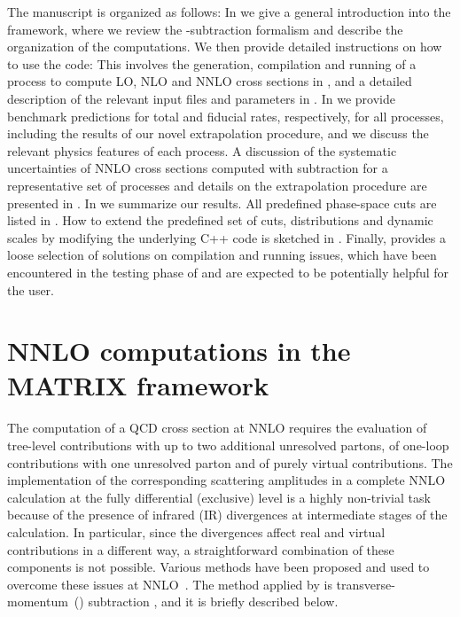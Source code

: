 \documentclass[english,11pt]{article}
\begin{document}
The manuscript is organized as follows: In  we give a general introduction into the \Matrix{} framework, 
where we review the \qt{}-subtraction formalism 
and describe the organization of the computations.  
We then provide detailed instructions on how to use the code:
This involves the generation, compilation and running of a process to compute LO, NLO and NNLO 
cross sections in , and a detailed description of the relevant input files and parameters 
in .
In  we provide benchmark predictions for total and fiducial rates, respectively, for all processes, including the results of our novel 
extrapolation procedure, and 
we discuss the relevant physics features of each process. 
A discussion of the systematic uncertainties of NNLO cross sections
computed with \qt{} subtraction for a representative set of processes
and details on the extrapolation procedure 
are presented in .
In  we summarize our results. 
All predefined phase-space cuts are listed in .
How to extend the predefined set of cuts, distributions and dynamic scales by modifying the underlying \textsc{C++} code is sketched in .
Finally,  provides a loose selection of solutions on compilation and running issues, 
which have been encountered in the testing phase of \Matrix{} and are expected to be potentially helpful for the user.

\section[NNLO computations in the M{\scriptsize ATRIX} framework]{NNLO computations in the M{\small ATRIX} framework}
\label{sec:general}

The computation of a QCD cross section at NNLO requires 
the evaluation of tree-level contributions with up to two additional unresolved partons,
of one-loop contributions with one unresolved parton and of purely virtual contributions.
The implementation of the corresponding scattering amplitudes in a complete NNLO calculation at the fully differential (exclusive) level is a highly non-trivial task because of the presence of infrared (IR) divergences at intermediate stages of the calculation. In particular, since the divergences affect real and virtual contributions in a different way, a straightforward combination of these components is not possible. Various methods have been proposed and used to
overcome these issues at NNLO~\cite{Kosower:1997zr, GehrmannDeRidder:2005cm,Daleo:2006xa,Currie:2013vh,Catani:2007vq,Somogyi:2005xz,DelDuca:2015zqa,DelDuca:2016csb,Czakon:2010td,Czakon:2011ve,Czakon:2014oma,Boughezal:2015dva,Boughezal:2015eha,Gaunt:2015pea,Caola:2017dug}. The method applied by \Matrix{} is transverse-momentum~(\qt{}) subtraction \cite{Catani:2007vq}, and it is briefly described below.
\end{document}
